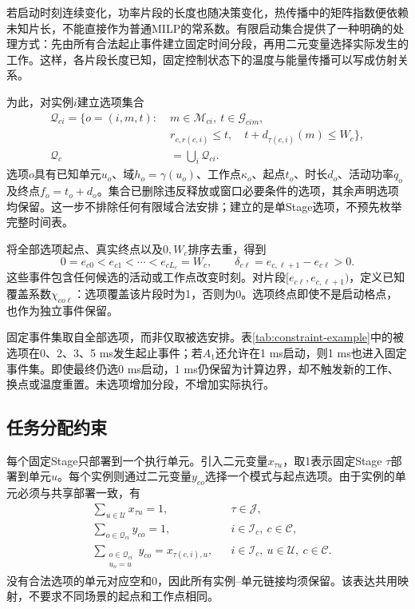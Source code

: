 若启动时刻连续变化，功率片段的长度也随决策变化，热传播中的矩阵指数便依赖未知片长，不能直接作为普通MILP的常系数。有限启动集合提供了一种明确的处理方式：先由所有合法起止事件建立固定时间分段，再用二元变量选择实际发生的工作。这样，各片段长度已知，固定控制状态下的温度与能量传播可以写成仿射关系。

为此，对实例\(i\)建立选项集合
\begin{equation}
\begin{aligned}
\mathcal Q_{ci}=\{o=(i,m,t):\;&m\in\mathcal M_{ci},\ t\in\mathcal G_{cim},\\
&r_{c,r(c,i)}\le t,\quad t+d_{\tau(c,i)}(m)\le W_c\},\\
\mathcal Q_c&=\bigcup_i\mathcal Q_{ci}.
\end{aligned}
\label{eq:options}
\end{equation}
选项\(o\)具有已知单元\(u_o\)、域\(h_o=\gamma(u_o)\)、工作点\(\kappa_o\)、起点\(t_o\)、时长\(d_o\)、活动功率\(q_o\)及终点\(f_o=t_o+d_o\)。集合已删除违反释放或窗口必要条件的选项，其余声明选项均保留。这一步不排除任何有限域合法安排；建立的是单Stage选项，不预先枚举完整时间表。

将全部选项起点、真实终点以及\(0,W_c\)排序去重，得到
\begin{equation}
0=e_{c0}<e_{c1}<\cdots<e_{cL_c}=W_c,\qquad
\delta_{c\ell}=e_{c,\ell+1}-e_{c\ell}>0.
\label{eq:events}
\end{equation}
这些事件包含任何候选的活动或工作点改变时刻。对片段\([e_{c\ell},e_{c,\ell+1})\)，定义已知覆盖系数\(\chi_{co\ell}\)：选项覆盖该片段时为1，否则为0。选项终点即使不是启动格点，也作为独立事件保留。

固定事件集取自全部选项，而非仅取被选安排。表\ref{tab:constraint-example}中的被选项在0、2、3、5 ms发生起止事件；若\(A_1\)还允许在1 ms启动，则1 ms也进入固定事件集。即使最终仍选0 ms启动，1 ms仍保留为计算边界，却不触发新的工作、换点或温度重置。未选项增加分段，不增加实际执行。

\subsection{任务分配约束}

每个固定Stage只部署到一个执行单元。引入二元变量\(x_{\tau u}\)，取1表示固定Stage \(\tau\)部署到单元\(u\)。每个实例则通过二元变量\(y_{co}\)选择一个模式与起点选项。由于实例的单元必须与共享部署一致，有
\begin{equation}
\begin{aligned}
&\sum_{u\in\mathcal U}x_{\tau u}=1,
&&\tau\in\mathcal J,\\
&\sum_{o\in\mathcal Q_{ci}}y_{co}=1,
&&i\in\mathcal I_c,\ c\in\mathcal C,\\
&\sum_{\substack{o\in\mathcal Q_{ci}\\u_o=u}}y_{co}=x_{\tau(c,i),u},
&&i\in\mathcal I_c,\ u\in\mathcal U,\ c\in\mathcal C.
\end{aligned}
\label{eq:milp-assignment}
\end{equation}
没有合法选项的单元对应空和0，因此所有实例--单元链接均须保留。该表达共用映射，不要求不同场景的起点和工作点相同。

